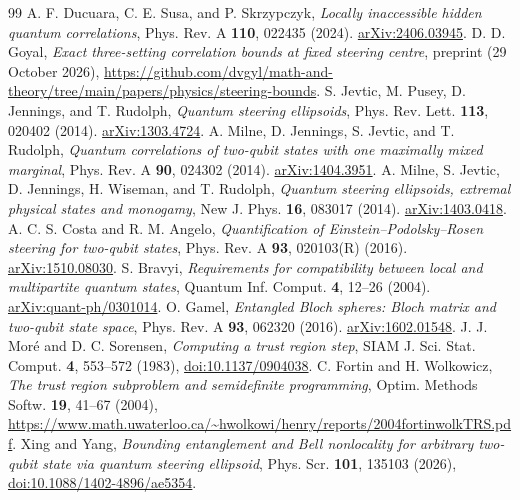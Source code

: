 \documentclass[11pt,a4paper]{article}
\theoremstyle{remark}\newtheorem{remark}[theorem]{Remark}
\begin{document}
\clearpage
\begin{thebibliography}{99}
\small\setlength{\itemsep}{3pt}\setlength{\parskip}{0pt}
 A. F. Ducuara, C. E. Susa, and P. Skrzypczyk,
\emph{Locally inaccessible hidden quantum correlations}, Phys. Rev. A
\textbf{110}, 022435 (2024).
\href{https://arxiv.org/abs/2406.03945}{arXiv:2406.03945}.
 D. D. Goyal, \emph{Exact three-setting correlation bounds
at fixed steering centre}, preprint (29 October 2026),
\url{https://github.com/dvgyl/math-and-theory/tree/main/papers/physics/steering-bounds}.
 S. Jevtic, M. Pusey, D. Jennings, and T. Rudolph,
\emph{Quantum steering ellipsoids}, Phys. Rev. Lett. \textbf{113}, 020402
(2014). \href{https://arxiv.org/abs/1303.4724}{arXiv:1303.4724}.
 A. Milne, D. Jennings, S. Jevtic, and T. Rudolph,
\emph{Quantum correlations of two-qubit states with one maximally mixed
marginal}, Phys. Rev. A \textbf{90}, 024302 (2014).
\href{https://arxiv.org/abs/1404.3951}{arXiv:1404.3951}.
 A. Milne, S. Jevtic, D. Jennings, H. Wiseman, and
T. Rudolph, \emph{Quantum steering ellipsoids, extremal physical states and
monogamy}, New J. Phys. \textbf{16}, 083017 (2014).
\href{https://arxiv.org/abs/1403.0418}{arXiv:1403.0418}.
 A. C. S. Costa and R. M. Angelo,
\emph{Quantification of Einstein--Podolsky--Rosen steering for two-qubit
states}, Phys. Rev. A \textbf{93}, 020103(R) (2016).
\href{https://arxiv.org/abs/1510.08030}{arXiv:1510.08030}.
 S. Bravyi, \emph{Requirements for compatibility between
local and multipartite quantum states}, Quantum Inf. Comput. \textbf{4},
12--26 (2004).
\href{https://arxiv.org/abs/quant-ph/0301014}{arXiv:quant-ph/0301014}.
 O. Gamel, \emph{Entangled Bloch spheres: Bloch matrix and
two-qubit state space}, Phys. Rev. A \textbf{93}, 062320 (2016).
\href{https://arxiv.org/abs/1602.01548}{arXiv:1602.01548}.
 J. J. Mor\'e and D. C. Sorensen,
\emph{Computing a trust region step}, SIAM J. Sci. Stat. Comput.
\textbf{4}, 553--572 (1983),
\href{https://doi.org/10.1137/0904038}{doi:10.1137/0904038}.
 C. Fortin and H. Wolkowicz,
\emph{The trust region subproblem and semidefinite programming},
Optim. Methods Softw. \textbf{19}, 41--67 (2004),
\url{https://www.math.uwaterloo.ca/~hwolkowi/henry/reports/2004fortinwolkTRS.pdf}.
 Xing and Yang, \emph{Bounding entanglement and Bell
nonlocality for arbitrary two-qubit state via quantum steering ellipsoid},
Phys. Scr. \textbf{101}, 135103 (2026),
\href{https://doi.org/10.1088/1402-4896/ae5354}{doi:10.1088/1402-4896/ae5354}.

\end{thebibliography}
\end{document}
